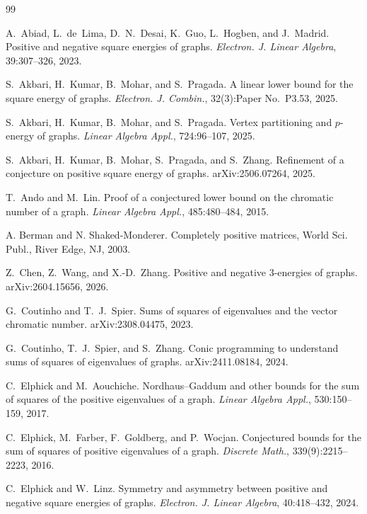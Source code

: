 \documentclass[11pt,letterpaper,reqno]{amsart}
\theoremstyle{definition}
\begin{document}
\begin{thebibliography}{99}



A.~Abiad, L.~de~Lima, D.~N.~Desai, K.~Guo, L.~Hogben, and J.~Madrid.
\newblock Positive and negative square energies of graphs.
\newblock \emph{Electron. J. Linear Algebra}, 39:307--326, 2023.

S.~Akbari, H.~Kumar, B.~Mohar, and S.~Pragada.
\newblock A linear lower bound for the square energy of graphs.
\newblock \emph{Electron. J. Combin.},
32(3):Paper No.~P3.53, 2025.

S.~Akbari, H.~Kumar, B.~Mohar, and S.~Pragada.
\newblock Vertex partitioning and $p$-energy of graphs.
\newblock \emph{Linear Algebra Appl.}, 724:96--107, 2025.

S.~Akbari, H.~Kumar, B.~Mohar, S.~Pragada, and S.~Zhang.
\newblock Refinement of a conjecture on positive square energy of graphs.
\newblock arXiv:2506.07264, 2025.

T.~Ando and M.~Lin.
\newblock Proof of a conjectured lower bound on the chromatic number of a
graph.
\newblock \emph{Linear Algebra Appl.}, 485:480--484, 2015.

A. Berman and N. Shaked-Monderer.
\newblock Completely positive matrices,
\newblock World Sci. Publ., River Edge, NJ, 2003.

Z.~Chen, Z.~Wang, and X.-D.~Zhang.
\newblock Positive and negative $3$-energies of graphs.
\newblock arXiv:2604.15656, 2026.

G.~Coutinho and T.~J.~Spier.
\newblock Sums of squares of eigenvalues and the vector chromatic number.
\newblock arXiv:2308.04475, 2023.

G.~Coutinho, T.~J.~Spier, and S.~Zhang.
\newblock Conic programming to understand sums of squares of eigenvalues of
graphs.
\newblock arXiv:2411.08184, 2024.

C.~Elphick and M.~Aouchiche.
\newblock Nordhaus--Gaddum and other bounds for the sum of squares of the
positive eigenvalues of a graph.
\newblock \emph{Linear Algebra Appl.}, 530:150--159, 2017.

C.~Elphick, M.~Farber, F.~Goldberg, and P.~Wocjan.
\newblock Conjectured bounds for the sum of squares of positive eigenvalues
of a graph.
\newblock \emph{Discrete Math.}, 339(9):2215--2223, 2016.

C.~Elphick and W.~Linz.
\newblock Symmetry and asymmetry between positive and negative square
energies of graphs.
\newblock \emph{Electron. J. Linear Algebra}, 40:418--432, 2024.


\end{thebibliography}
\end{document}
